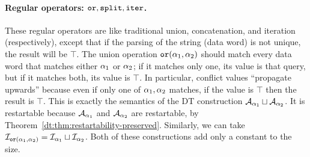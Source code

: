 


\paragraph*{Regular operators: $\texttt{or}, \texttt{split}, \texttt{iter}$.}
These regular operators are like traditional union, concatenation, and iteration (respectively), except that if the parsing of the string (data word) is not unique, the result will be $\top$.
The union operation $\texttt{or}(\alpha_1, \alpha_2)$ should match every data word that matches either $\alpha_1$ or $\alpha_2$; if it matches only one, its value is that query, but if it matches both, its value is $\top$. In particular, conflict values ``propagate upwards'' because even if only one of $\alpha_1, \alpha_2$ matches, if the value is $\top$ then the result is $\top$. This is exactly the semantics of the DT construction $\mathcal{A}_{\alpha_1} \sqcup \mathcal{A}_{\alpha_2}$. It is restartable because $\mathcal{A}_{\alpha_1}$ and $\mathcal{A}_{\alpha_2}$ are restartable, by Theorem~\ref{dt:thm:restartability-preserved}.
Similarly, we can take $\mathcal{I}_{\texttt{or}(\alpha_1,\alpha_2)} = \mathcal{I}_{\alpha_1} \sqcup \mathcal{I}_{\alpha_2}$.
Both of these constructions add only a constant to the size.

